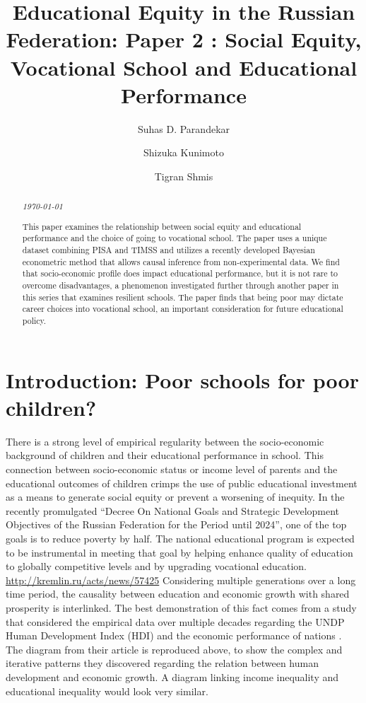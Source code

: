 \documentclass[alpha-refs,fleqn]{wiley-article_p2}
\title{Educational Equity in the Russian Federation: Paper 2 : Social Equity, Vocational School and Educational Performance}
\author[*]{Suhas D. Parandekar}
\author[*]{Shizuka Kunimoto}
\author[*]{Tigran Shmis}
\affil[*]{Education Global Practice, Europe and Central Asia}
\begin{document}

\maketitle

\begin{abstract}
\emph{\today \hspace{1em} \currenttime }

\vspace{1em}

\noindent This paper examines the relationship between social equity and educational performance and the choice of going to vocational school. The paper uses a unique dataset combining PISA and TIMSS and utilizes a recently developed Bayesian econometric method that allows causal inference from non-experimental data. We find that socio-economic profile does impact educational performance, but it is not rare to overcome disadvantages, a phenomenon investigated further through another paper in this series that examines resilient schools. The paper finds that being poor may dictate career choices into vocational school, an important consideration for future educational policy. 


\end{abstract}


\section{Introduction: Poor schools for poor children?}

There is a strong level of empirical regularity between the socio-economic background of children and their educational performance in school. This connection between socio-economic status or income level of parents and the educational outcomes of children crimps the use of public educational investment as a means to generate social equity or prevent a worsening of inequity. In the recently promulgated ``Decree On National Goals and Strategic Development Objectives of the Russian Federation for the Period until 2024'', one of the top goals is to reduce poverty by half. The national educational program is expected to be instrumental in meeting that goal by helping enhance quality of education to globally competitive levels and by upgrading vocational education. \url{http://kremlin.ru/acts/news/57425} Considering multiple generations over a long time period, the causality between education and economic growth with shared prosperity is interlinked. The best demonstration of this fact comes from a study that considered the empirical data over multiple decades regarding the UNDP Human Development Index (HDI) and the economic performance of nations \cite{Ranis_2000}. The diagram from their article is reproduced above, to show the complex and iterative patterns they discovered regarding the relation between human development and economic growth. A diagram linking income inequality and educational inequality would look very similar. 
\end{document}
